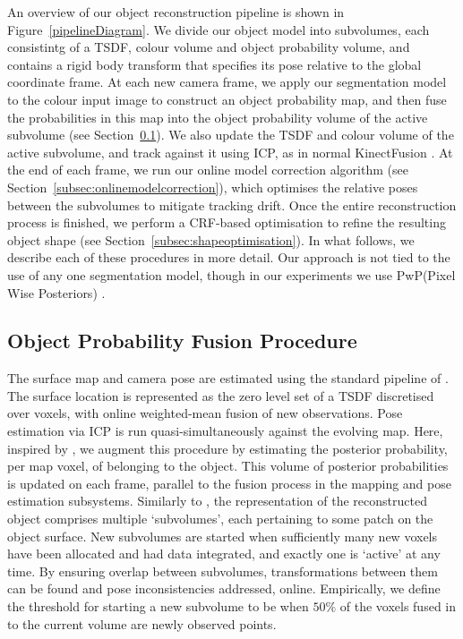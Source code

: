 An overview of our object reconstruction pipeline is shown in Figure~\ref{pipelineDiagram}. We divide our object model into subvolumes, each consistintg of a TSDF, 
colour volume and object probability volume, and contains a rigid body transform that specifies its pose relative to the global coordinate frame. At each new camera frame, we apply our segmentation model to the colour input image to construct an object probability map, and then fuse the probabilities in this map into the object probability volume of the active subvolume (see Section~\ref{subsec:probfusion}). We also update the TSDF and colour volume of the active subvolume, and track against it using ICP, as in normal KinectFusion \cite{Newcombe2011}. At the end of each frame, we run our online model correction algorithm (see Section~\ref{subsec:onlinemodelcorrection}), which optimises the relative poses between the subvolumes to mitigate tracking drift. Once the entire reconstruction process is finished, we perform a CRF-based optimisation to refine the resulting object shape (see Section~\ref{subsec:shapeoptimisation}). In what follows, we describe each of these procedures in more detail. Our approach is not tied to the use of any one segmentation model, though in our experiments we use PwP(Pixel Wise Posteriors) \cite{Bibby2008}.

\subsection{Object Probability Fusion Procedure}
\label{subsec:probfusion}

The surface map and camera pose are estimated using the standard pipeline of \cite{Newcombe2011,Prisacariu2014}. The surface location is represented as the zero level set of a TSDF discretised over voxels, with online weighted-mean fusion of new observations. Pose estimation via ICP is run quasi-simultaneously against the evolving map. Here, inspired by \cite{Kolev2006}, we augment this procedure by estimating the posterior probability, per map voxel, of belonging to the object. This volume of posterior probabilities is updated on each frame, parallel to the fusion process in the mapping and pose estimation subsystems. Similarly to \cite{Kahler2016}, the representation of the reconstructed object comprises multiple `subvolumes', each pertaining to some patch on the object surface. New subvolumes are started when sufficiently many new voxels have been allocated and had data integrated, and exactly one is `active' at any time. By ensuring overlap between subvolumes, transformations between them can be found and pose inconsistencies addressed, online. Empirically, we define the threshold for starting a new subvolume to be when $50\%$ of the voxels fused in to the current volume are newly observed points.

